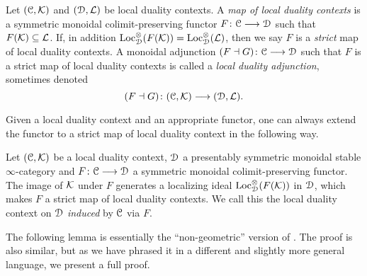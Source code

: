 \begin{definition}
    Let $(\EuScript{C}, \mathcal{K})$ and $(\EuScript{D}, \mathcal{L})$ be local duality contexts. A \emph{map of local duality contexts} is a symmetric monoidal colimit-preserving functor $F\colon \EuScript{C}\longrightarrow \EuScript{D}$ such that $F(\mathcal{K})\subseteq \mathcal{L}$. If, in addition $\operatorname{Loc}_{\EuScript{D}}^\otimes(F(\mathcal{K})) = \operatorname{Loc}_{\EuScript{D}}^\otimes(\mathcal{L})$, then we say $F$ is a \emph{strict} map of local duality contexts. A monoidal adjunction $(F\dashv G)\colon \EuScript{C}\longrightarrow \EuScript{D}$ such that $F$ is a strict map of local duality contexts is called a \emph{local duality adjunction}, sometimes denoted 
    \[(F\dashv G)\colon (\EuScript{C}, \mathcal{K})\longrightarrow (\EuScript{D}, \mathcal{L}).\]
\end{definition}

Given a local duality context and an appropriate functor, one can always extend the functor to a strict map of local duality context in the following way. 

\begin{construction}
    Let $(\EuScript{C}, \mathcal{K})$ be a local duality context, $\EuScript{D}$ a presentably symmetric monoidal stable $\infty$-category and $F\colon \EuScript{C}\longrightarrow \EuScript{D}$ a symmetric monoidal colimit-preserving functor. The image of $\mathcal{K}$ under $F$ generates a localizing ideal $\operatorname{Loc}^\otimes_{\EuScript{D}}(F(\mathcal{K}))$ in $\EuScript{D}$, which makes $F$ a strict map of local duality contexts. We call this the local duality context on $\EuScript{D}$ \emph{induced} by $\EuScript{C}$ via $F$. 
\end{construction}

The following lemma is essentially the ``non-geometric'' version of \cite[5.11]{balmer-sanders_2017}. The proof is also similar, but as we have phrased it in a different and slightly more general language, we present a full proof. 

